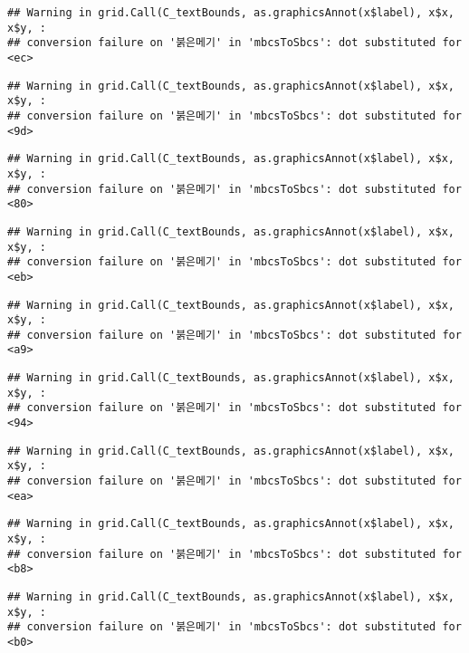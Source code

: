 \documentclass[
]{article}
\begin{document}
\begin{verbatim}
## Warning in grid.Call(C_textBounds, as.graphicsAnnot(x$label), x$x, x$y, :
## conversion failure on '붉은메기' in 'mbcsToSbcs': dot substituted for <ec>
\end{verbatim}

\begin{verbatim}
## Warning in grid.Call(C_textBounds, as.graphicsAnnot(x$label), x$x, x$y, :
## conversion failure on '붉은메기' in 'mbcsToSbcs': dot substituted for <9d>
\end{verbatim}

\begin{verbatim}
## Warning in grid.Call(C_textBounds, as.graphicsAnnot(x$label), x$x, x$y, :
## conversion failure on '붉은메기' in 'mbcsToSbcs': dot substituted for <80>
\end{verbatim}

\begin{verbatim}
## Warning in grid.Call(C_textBounds, as.graphicsAnnot(x$label), x$x, x$y, :
## conversion failure on '붉은메기' in 'mbcsToSbcs': dot substituted for <eb>
\end{verbatim}

\begin{verbatim}
## Warning in grid.Call(C_textBounds, as.graphicsAnnot(x$label), x$x, x$y, :
## conversion failure on '붉은메기' in 'mbcsToSbcs': dot substituted for <a9>
\end{verbatim}

\begin{verbatim}
## Warning in grid.Call(C_textBounds, as.graphicsAnnot(x$label), x$x, x$y, :
## conversion failure on '붉은메기' in 'mbcsToSbcs': dot substituted for <94>
\end{verbatim}

\begin{verbatim}
## Warning in grid.Call(C_textBounds, as.graphicsAnnot(x$label), x$x, x$y, :
## conversion failure on '붉은메기' in 'mbcsToSbcs': dot substituted for <ea>
\end{verbatim}

\begin{verbatim}
## Warning in grid.Call(C_textBounds, as.graphicsAnnot(x$label), x$x, x$y, :
## conversion failure on '붉은메기' in 'mbcsToSbcs': dot substituted for <b8>
\end{verbatim}

\begin{verbatim}
## Warning in grid.Call(C_textBounds, as.graphicsAnnot(x$label), x$x, x$y, :
## conversion failure on '붉은메기' in 'mbcsToSbcs': dot substituted for <b0>
\end{verbatim}
\end{document}

